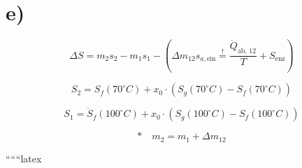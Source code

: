 

\section*{e)}
\[
\Delta S = m_2 s_2 - m_1 s_1 - (\Delta m_{12} s_{a, \text{ein}} \stackrel{!}{=} \frac{\dot{Q}_{\text{ab, 12}}}{T} + S_{\text{enz}})
\]

\[
S_2 = S_f (70^\circ C) + x_0 \cdot (S_g (70^\circ C) - S_f (70^\circ C))
\]

\[
S_1 = \dot{S}_f (100^\circ C) + x_0 \cdot (S_g (100^\circ C) - S_f (100^\circ C))
\]

\[
\text{*} \quad m_2 = m_1 + \Delta m_{12}
\]

``````latex